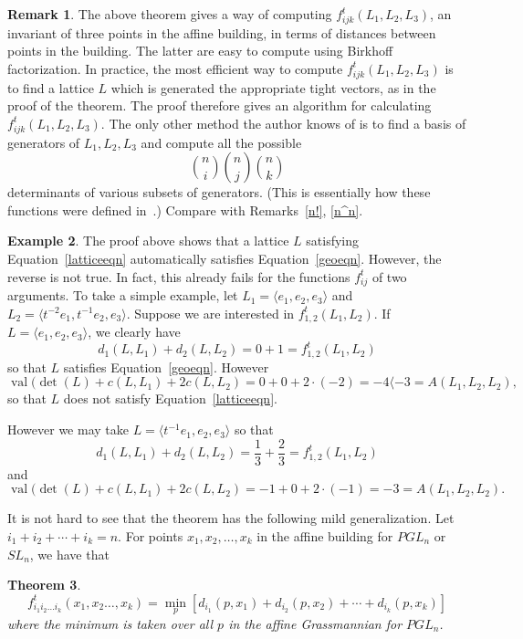 \documentclass[10pt]{amsart}
\newtheorem{theorem}{Theorem}[section]
\theoremstyle{definition}
\newtheorem{example}[theorem]{Example}
\newtheorem{rema}[theorem]{Remark}
\newcommand{\val}{\operatorname{val}}
\begin{document}
\begin{rema} The above theorem gives a way of computing $f_{ijk}^t (L_1,L_2,L_3)$, an invariant of three points in the affine building, in terms of distances between points in the building. The latter are easy to compute using Birkhoff factorization. In practice, the most efficient way to compute $f_{ijk}^t (L_1,L_2,L_3)$ is to find a lattice $L$ which is generated the appropriate tight vectors, as in the proof of the theorem. The proof therefore gives an algorithm for calculating $f_{ijk}^t (L_1,L_2,L_3)$. The only other method the author knows of is to find a basis of generators of $L_1, L_2, L_3$ and compute all the possible
\[
 \binom{n}{i} \binom{n}{j} \binom{n}{k}
\] 
determinants of various subsets of generators. (This is essentially how these functions were defined in~\cite{K}.) Compare with Remarks~\ref{n!}, \ref{n^n}.
\end{rema}

\begin{example} The proof above shows that a lattice $L$ satisfying Equation~\eqref{latticeeqn} automatically satisfies Equation~\eqref{geoeqn}. However, the reverse is not true. In fact, this already fails for the functions $f^t_{ij}$ of two arguments. To take a simple example, let $L_1=\langle e_1, e_2, e_3\rangle $ and $L_2=\langle t^{-2}e_1, t^{-1}e_2, e_3\rangle $. Suppose we are interested in $f^t_{1,2}(L_1,L_2)$. If $L=\langle e_1, e_2, e_3\rangle $, we clearly have 
\[
d_1(L,L_1) + d_2(L,L_2) = 0 + 1 = f^t_{1,2}(L_1,L_2)
\]
so that $L$ satisfies Equation~\eqref{geoeqn}. However
\[
\val(\det(L) + c(L,L_1) + 2c(L,L_2) = 0 + 0 + 2\cdot(-2) = -4 \langle -3 = A(L_1,L_2,L_2),
\]
so that $L$ does not satisfy Equation~\eqref{latticeeqn}.

However we may take $L=\langle t^{-1}e_1, e_2, e_3\rangle $ so that
\[
d_1(L,L_1) + d_2(L,L_2) = \frac{1}{3} + \frac{2}{3} = f^t_{1,2}(L_1,L_2)
\]
and 
\[
\val(\det(L) + c(L,L_1) + 2c(L,L_2) = -1 + 0 + 2\cdot(-1) = -3 = A(L_1,L_2,L_2).
\]
\end{example}


It is not hard to see that the theorem has the following mild generalization. Let $i_1+i_2+\cdots+i_k=n$. For points $x_1, x_2, \dots, x_k$ in the affine building for $PGL_n$ or $SL_n$, we have that
\begin{theorem}\label{basicfn}
\[
f_{i_1i_2\dots i_k}^t(x_1,x_2\dots,x_k)= \min_{p} [ d_{i_1}(p,x_1) + d_{i_2}(p,x_2) + \cdots + d_{i_k}(p,x_k) ]
\]
where the minimum is taken over all $p$ in the affine Grassmannian for $PGL_n$.
\end{theorem}
\end{document}
